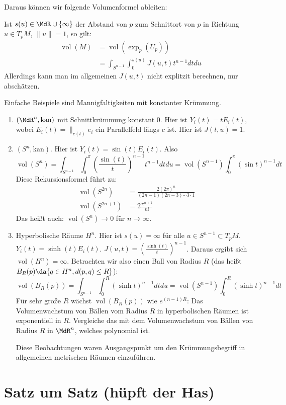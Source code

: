 \documentclass[a4paper,twoside,DIV15,BCOR12mm]{scrbook}
\newcommand{\kan}{\text{kan}}
\DeclareMathOperator{\vol}{vol}
\begin{document}
Daraus können wir folgende Volumenformel ableiten:

Ist $s(u) \in \MdR\cup\{\infty\}$ der Abstand von $p$ zum Schnittort von $p$ in Richtung $u\in T_pM$, $\|u\|=1$, so gilt:
\begin{align*}
\vol(M) &= \vol(\exp_p(U_p)) \\
&= \int_{S^{n-1}} \int_0^{s(u)} J(u,t) t^{n-1} dt du
\end{align*}
Allerdings kann man im allgemeinen $J(u,t)$ nicht explitzit berechnen, nur abschätzen.

Einfache Beispiele sind Mannigfaltigkeiten mit konstanter Krümmung.
\begin{enumerate}
\item $(\MdR^n,\kan)$ mit Schnittkrümmung konstant 0. Hier ist $Y _i(t) = t E_i(t)$, wobei $E_i(t) = \|_{c(t)}e_i$ ein Parallelfeld längs $c$ ist. Hier ist $J(t,u)=1$. 
\item $(S^n,\kan)$. Hier ist $Y_i(t) = \sin(t) E_i(t)$. Also 
\[ \vol(S^n)= \int_{S^{n-1}} \int_0^\pi \left(\frac{\sin(t)}{t}\right)^{n-1} t^{n-1} dt du = \vol(S^{n-1}) \int_0^\pi (\sin t)^{n-1}dt \]
Diese Rekursionsformel führt zu:
\begin{align*}
\vol(S^{2n}) &= \frac {2 (2\pi)^n} {(2n-1)(2n-3)\cdots 3\cdot 1} \\
\vol(S^{2n+1}) &= 2\frac {\pi^{n+1}} {n!}
\end{align*}
Das heißt auch: $\vol(S^n)\to 0$ für $n\to \infty$.
\item Hyperbolische Räume $H^n$. Hier ist $s(u)=\infty$ für alle $u\in S^{n-1}\subset T_pM$. $Y_i(t) = \sinh(t)E_i(t)$. $J(u,t) = \left( \frac {\sinh(t)} t \right)^{n-1}$.
Daraus ergibt sich $\vol(H^n)=\infty$. Betrachten wir also einen Ball von Radius $R$ (das heißt $B_R(p) \da \{ q\in H^n, d(p,q)\le R\}$):
\[
\vol(B_R(p)) = \int_{S^{n-1}} \int_0^R (\sinh t)^{n-1} dt du = \vol(S^{n-1}) \int_0^R (\sinh t)^{n-1} dt
\]
Für sehr große $R$ wächst $\vol(B_R(p))$ wie $e^{(n-1)R}$: Das Volumenwachstum von Bällen vom Radius $R$ in hyperbolischen Räumen ist exponentiell in $R$. Vergleiche das mit dem Volumenwachstum von Bällen von Radius $R$ in $\MdR^n$, welches polynomial ist.

Diese Beobachtungen waren Ausgangspunkt um den Krümmungsbegriff in allgemeinen metrischen Räumen einzuführen.
\end{enumerate}


\appendix

\chapter{Satz um Satz (hüpft der Has)}

\renewcommand{\indexname}{Stichwortverzeichnis}
\addtocounter{chapter}{1}
\printindex
\end{document}
